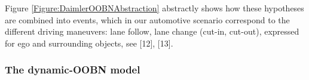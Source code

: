 Figure \ref{Figure:DaimlerOOBNAbstraction} abstractly shows how these hypotheses are combined into events, which in our automotive scenario correspond to the different driving maneuvers: lane follow, lane change (cut-in, cut-out), expressed for ego and surrounding objects, see [12], [13].


\subsubsection*{The dynamic-OOBN model}

